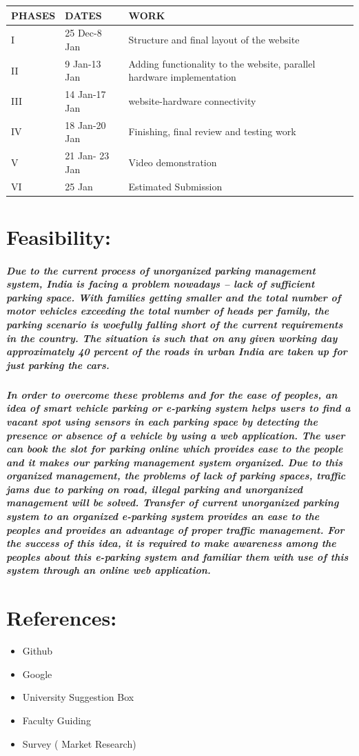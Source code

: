 \documentclass[]{article}
\begin{document}
    \begin{center}
    \begin{tabular}{|l|l|l|}
\hline
 PHASES & DATES & WORK \\
\hline
I & 25 Dec-8 Jan & Structure and final layout of the website \\
\hline
II & 9 Jan-13 Jan & Adding functionality to the website, parallel hardware implementation \\ 
\hline
III & 14 Jan-17 Jan & website-hardware connectivity \\
\hline
IV & 18 Jan-20 Jan & Finishing, final review and testing work \\
\hline
V & 21 Jan- 23 Jan & Video demonstration \\
\hline
VI & 25 Jan & Estimated Submission \\
\hline
    \end{tabular}
    \end{center}
    
\section{Feasibility:}
\subparagraph{Due to the current process of unorganized parking management system, India is facing a problem nowadays – lack of sufficient parking space. With families getting smaller and the total number of motor vehicles exceeding the total number of heads per family, the parking scenario is woefully falling short of the current requirements in the country. The situation is such that on any given working day approximately 40 percent of the roads in urban India are taken up for just parking the cars.}
\subparagraph{In order to overcome these problems and for the ease of peoples, an idea of smart vehicle parking or e-parking system helps users to find a vacant spot using sensors in each parking space by detecting the presence or absence of a vehicle by using a web application. The user can book the slot for parking online which provides ease to the people and it makes our parking management system organized. Due to this organized management, the problems of lack of parking spaces, traffic jams due to parking on road, illegal parking and unorganized management will be solved. Transfer of current unorganized parking system to an organized e-parking system provides an ease to the peoples and provides an advantage of proper traffic management. For the success of this idea, it is required to make awareness among the peoples about this e-parking system and familiar them with use of this system through an online web application.}

\section{References:}
\begin{itemize}
	\item Github
	\item Google
	\item University Suggestion Box
	\item Faculty Guiding
	\item Survey ( Market Research)
\end{itemize}
\end{document}
